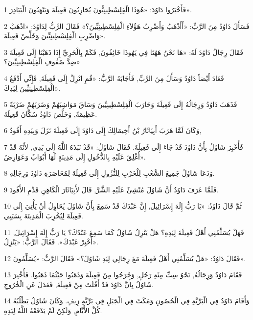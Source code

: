 \par 1 فَأَخْبَرُوا دَاوُدَ: «هُوَذَا الْفِلِسْطِينِيُّونَ يُحَارِبُونَ قَعِيلَةَ وَيَنْهَبُونَ الْبَيَادِرَ».
\par 2 فَسَأَلَ دَاوُدُ مِنَ الرَّبِّ: «أَأَذْهَبُ وَأَضْرِبُ هَؤُلاَءِ الْفِلِسْطِينِيِّينَ؟» فَقَالَ الرَّبُّ لِدَاوُدَ: «اذْهَبْ وَاضْرِبِ الْفِلِسْطِينِيِّينَ وَخَلِّصْ قَعِيلَةَ».
\par 3 فَقَالَ رِجَالُ دَاوُدَ لَهُ: «هَا نَحْنُ هَهُنَا فِي يَهُوذَا خَائِفُونَ, فَكَمْ بِالْحَرِيِّ إِذَا ذَهَبْنَا إِلَى قَعِيلَةَ ضِدَّ صُفُوفِ الْفِلِسْطِينِيِّينَ؟»
\par 4 فَعَادَ أَيْضاً دَاوُدُ وَسَأَلَ مِنَ الرَّبِّ, فَأَجَابَهُ الرَّبُّ: «قُمِ انْزِلْ إِلَى قَعِيلَةَ, فَإِنِّي أَدْفَعُ الْفِلِسْطِينِيِّينَ لِيَدِكَ».
\par 5 فَذَهَبَ دَاوُدُ وَرِجَالُهُ إِلَى قَعِيلَةَ وَحَارَبَ الْفِلِسْطِينِيِّينَ وَسَاقَ مَوَاشِيَهُمْ وَضَرَبَهُمْ ضَرْبَةً عَظِيمَةً, وَخَلَّصَ دَاوُدُ سُكَّانَ قَعِيلَةَ.
\par 6 وَكَانَ لَمَّا هَرَبَ أَبِيَاثَارُ بْنُ أَخِيمَالِكَ إِلَى دَاوُدَ إِلَى قَعِيلَةَ نَزَلَ وَبِيَدِهِ أَفُودٌ,
\par 7 فَأُخْبِرَ شَاوُلُ بِأَنَّ دَاوُدَ قَدْ جَاءَ إِلَى قَعِيلَةَ. فَقَالَ شَاوُلُ: «قَدْ نَبَذَهُ اللَّهُ إِلَى يَدِي, لأَنَّهُ قَدْ أُغْلِقَ عَلَيْهِ بِالدُّخُولِ إِلَى مَدِينَةٍ لَهَا أَبْوَابٌ وَعَوَارِضُ».
\par 8 وَدَعَا شَاوُلُ جَمِيعَ الشَّعْبِ لِلْحَرْبِ لِلنُّزُولِ إِلَى قَعِيلَةَ لِمُحَاصَرَةِ دَاوُدَ وَرِجَالِهِ.
\par 9 فَلَمَّا عَرَفَ دَاوُدُ أَنَّ شَاوُلَ مُنْشِئٌ عَلَيْهِ الشَّرَّ, قَالَ لأَبِيَاثَارَ الْكَاهِنِ قَدِّمِ الأَفُودَ.
\par 10 ثُمَّ قَالَ دَاوُدُ: «يَا رَبُّ إِلَهَ إِسْرَائِيلَ, إِنَّ عَبْدَكَ قَدْ سَمِعَ بِأَنَّ شَاوُلَ يُحَاوِلُ أَنْ يَأْتِيَ إِلَى قَعِيلَةَ لِيُخْرِبَ الْمَدِينَةَ بِسَبَبِي.
\par 11 فَهَلْ يُسَلِّمُنِي أَهْلُ قَعِيلَةَ لِيَدِهِ؟ هَلْ يَنْزِلُ شَاوُلُ كَمَا سَمِعَ عَبْدُكَ؟ يَا رَبُّ إِلَهَ إِسْرَائِيلَ, أَخْبِرْ عَبْدَكَ». فَقَالَ الرَّبُّ: «يَنْزِلُ».
\par 12 فَقَالَ دَاوُدُ: «هَلْ يُسَلِّمُنِي أَهْلُ قَعِيلَةَ مَعَ رِجَالِي لِيَدِ شَاوُلَ؟» فَقَالَ الرَّبُّ: «يُسَلِّمُونَ».
\par 13 فَقَامَ دَاوُدُ وَرِجَالُهُ, نَحْوُ سِتِّ مِئَةِ رَجُلٍ, وَخَرَجُوا مِنْ قَعِيلَةَ وَذَهَبُوا حَيْثُمَا ذَهَبُوا. فَأُخْبِرَ شَاوُلُ بِأَنَّ دَاوُدَ قَدْ أَفْلَتَ مِنْ قَعِيلَةَ, فَعَدَلَ عَنِ الْخُرُوجِ.
\par 14 وَأَقَامَ دَاوُدُ فِي الْبَرِّيَّةِ فِي الْحُصُونِ وَمَكَثَ فِي الْجَبَلِ فِي بَرِّيَّةِ زِيفٍ. وَكَانَ شَاوُلُ يَطْلُبُهُ كُلَّ الأَيَّامِ, وَلَكِنْ لَمْ يَدْفَعْهُ اللَّهُ لِيَدِهِ.
